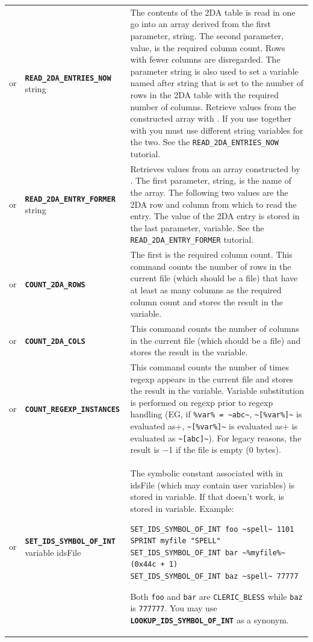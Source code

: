 \documentclass{article}
\def\ttref#1{\ahrefloc{#1}{\tt #1}}
\def\DEFINE#1{{\tt \bf #1}\label{#1}\index{#1}}
\def\t#1{{\tt #1}}
\begin{document}
\begin{tabular}{cp{10in}|p{10in}}
  or & \DEFINE{READ_2DA_ENTRIES_NOW} string \ttref{value} &

  The contents of the 2DA table is read in one go into an array
  derived from the first parameter, string. The second parameter,
  value, is the required column count. Rows with fewer columns are
  disregarded. The parameter string is also used to set a variable
  named after string that is set to the number of rows in the 2DA
  table with the required number of columns. Retrieve values from the
  constructed array with \ttref{READ_2DA_ENTRY_FORMER}. If you use
  \ttref{READ_2DA_ENTRIES_NOW} together with
  \ttref{SET_2DA_ENTRY_LATER} you must use different string variables
  for the two. See the \t{READ_2DA_ENTRIES_NOW} tutorial. \\

  or & \DEFINE{READ_2DA_ENTRY_FORMER} string \ttref{value} \ttref{value}
  \ttref{variable} &

  Retrieves values from an array constructed by
  \ttref{READ_2DA_ENTRIES_NOW}. The first parameter, string, is the
  name of the array. The following two values are the 2DA row and
  column from which to read the entry. The value of the 2DA entry is
  stored in the last parameter, variable. See the
  \t{READ_2DA_ENTRY_FORMER} tutorial. \\

or & \DEFINE{COUNT_2DA_ROWS} \ttref{value} \ttref{variable} &
  The first \ttref{value} is the required column count. This command
  counts the number of rows in the current file (which should be a
  \ttref{2DA} file) that have at least as many columns as the required
  column count and stores the result in the variable. \\
or & \DEFINE{COUNT_2DA_COLS} \ttref{variable} &
  This command counts the number of columns in the current file (which should be a
  \ttref{2DA} file) and stores the result in the variable. \\
or & \DEFINE{COUNT_REGEXP_INSTANCES} \ttref{optcase} \ttref{optexact} \ttref{regexp}
    \ttref{variable} &
  This command counts the number of times regexp appears in the
  current file and stores the result in the variable. Variable
  substitution is performed on regexp prior to regexp handling (EG, if
  \verb+%var% = ~abc~+, \verb+~[%var%]~+ is evaluated as
  \verb+~[abc]~+). For legacy reasons, the result is −1 if the file is
  empty (0 bytes). \\

or & \DEFINE{SET_IDS_SYMBOL_OF_INT} variable idsFile \ttref{value} &
  The symbolic constant associated with \ttref{value} in idsFile (which may
  contain user variables) is stored
  in variable. If that doesn't work, \ttref{value} is stored in variable.
  Example:
\begin{verbatim}
SET_IDS_SYMBOL_OF_INT foo ~spell~ 1101
SPRINT myfile "SPELL"
SET_IDS_SYMBOL_OF_INT bar ~%myfile%~ (0x44c + 1)
SET_IDS_SYMBOL_OF_INT baz ~spell~ 77777
\end{verbatim}
  Both \t{foo} and \t{bar} are \t{CLERIC\_BLESS} while \t{baz} is
  \t{777777}. You may use \DEFINE{LOOKUP_IDS_SYMBOL_OF_INT} as a synonym. \\


\end{tabular}
\end{document}
